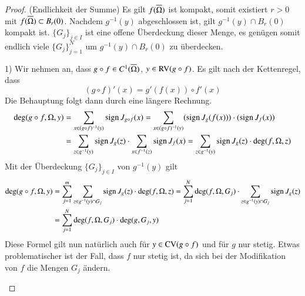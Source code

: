 \begin{proof}
    (Endlichkeit der Summe) Es gilt $f(\overline\Omega)$ ist kompakt, somit existiert $r>0$ mit $f(\overline \Omega)
    \subset B_r(0)$. Nachdem $g^{-1}(y)$ abgeschlossen ist, gilt $g^{-1}(y)\cap B_r(0)$ kompakt ist.
    $\{G_j\}_{j\in I}$ ist eine offene Überdeckung dieser Menge, es genügen somit endlich viele $\{  
    G_j \}_{j=1}^N$ um $g^{-1}(y)\cap B_r(0)$ zu überdecken.
    \begin{description}
    \item{1)}
    Wir nehmen an, dass $g\circ f\in C^1(\overline \Omega)$, $y\in \mathrm{RV}(g\circ f)$. Es gilt nach der
    Kettenregel, dass
    \[
        (g\circ f)'(x)=g'(f(x))\circ f'(x)
    \]
    Die Behauptung folgt dann durch eine längere Rechnung.
    \begin{align*}
        \deg(g\circ f,\Omega,y)&=\sum_{x\in(g\circ f)^{-1}(y)}\mathrm{sign}\, J_{g\circ f}(x)=\sum_{x\in (g\circ f)
        ^{-1} (y)}(\mathrm{sign}\, J_g(f(x)))\cdot(\mathrm{sign}\, J_f(x))\\
        &= \sum_{z\in g^{-1}(y)} \mathrm{sign}\, J_g(z)\cdot \sum_{x\in f^{-1}(z)} \mathrm{sign}\, J_f(x)
        =\sum_{z\in g^{-1}(y)} \mathrm{sign}\, J_g(z)\cdot \deg(f,\Omega,z)
    \end{align*}
    Mit der Überdeckung $\{G_j\}_{j\in I}$ von $g^{-1}(y)$ gilt
    \begin{align*}
        \deg(g\circ f,\Omega,y)&=\sum_{j=1}^m\sum_{z\in g^{-1}(y)\cap G_j}\mathrm{sign}\, J_g(z)\cdot \deg(f,\Omega,z)
        =\sum_{j=1}^N \deg(f,\Omega,G_j) \cdot \sum_{z\in g^{-1}(y)\cap G_j} \mathrm{sign}\, J_g(z)\\
        &= \sum_{j=1}^N \deg(f,\Omega,G_j)\cdot \deg(g,G_j,y)
    \end{align*}
    Diese Formel gilt nun natürlich auch für $y\in \mathrm{CV}(g\circ f)$ und für $g$ nur stetig. Etwas
    problematischer ist der Fall, dass $f$ nur stetig ist, da sich bei der Modifikation von $f$ die
    Mengen $G_j$ ändern.


\end{description}
\end{proof}
